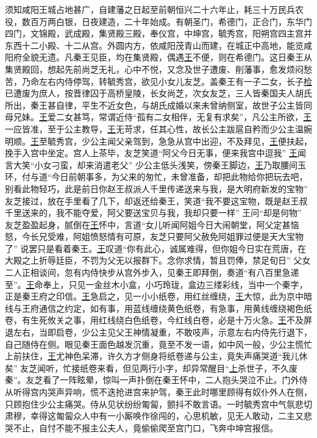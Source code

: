 \documentclass[UTF8]{ctexart}
\begin{document}
须知咸阳王城占地甚广，自建藩之日起至前朝恒兴二十六年止，耗三十万民兵农役，数百万两白银，日夜建造，二十年始成。有朝圣门，希德门，正合门，东华门四门，文锦殿，武成殿，集贤殿三殿，奉仪宫，中坤宫，毓秀宫，阳朔宫四主宫并东西十二小殿、十二从宫。外圆内方，依咸阳茂青山而建，在城正中高地，能览咸阳府全貌无遗。凡秦王见臣，均在集贤殿，偶遇\uline{王}不便，则在希德门。这日秦王从集贤殿回，想起先前尚芝无礼，心中不悦，又念及世子遭废、削藩事，愈发烦闷愁苦，乃命左右内侍停驾，转毓秀宫，欲见小女儿友芝。盖秦王有一子二女，长子\uline{检}已遭废为庶人，按晋律囚于高桥皇陵，长女尚芝，次女友芝，三人皆秦国夫人胡氏所出，秦王甚自律，平生不近女色，与胡氏成婚以来未曾纳侧室，故世子公主皆同母兄妹。\uline{王}爱二女甚笃，常谓近侍“孤有二女相伴，无复有求矣”，凡公主所欲，\uline{王}一应皆准，至于公主教导，\uline{王}无苛求，任其心性，故长公主跋扈自矜而少公主温婉明顺。\uline{王}至毓秀宫，少公主闻父亲驾到，急急从宫中出迎，不及拜见，\uline{王}便扶起，挽手入宫中坐定。宫人上茶毕，友芝笑道“阿父今日无事，便来我宫中逗我” \uline{王}闻言大笑“小女刁蛮，却来消遣老父” 少公主低头浅笑，傍秦王脚边，\uline{王}乃取腰间玉环，付与道“今日前朝事多，为父来的匆忙，未曾准备，却把此物给你把玩去吧，别看此物轻巧，此是前日你赵王叔派人千里传递送来与我，是大明府新发的宝物” 友芝接过，放在手里看了几下，却返还给秦王，笑道“我不要这宝物，既是赵王叔千里送来的，我不能夺爱，阿父要送宝贝与我，我却只要一样” 王问“却是何物” 友芝盈盈起身，腻倒在\uline{王}怀中，言道“女儿听闻阿姐今日大闹朝堂，阿父定甚恼怒，今长兄受难，阿姐愤怒情有可原，友芝只要阿父赦免阿姐罪过便是天大宝物了” 说罢只是看着秦王。\uline{王}叹道“你有此心，诚属难得，但你姐今日实在荒唐，在大殿之上折辱廷臣，不罚为父无以报群下。念你求情，暂且罚俸，禁足旬日”  父女二人正相谈间，忽有内侍快步从宫外步入，见秦王即拜倒，奏道“有八百里急递至”。\uline{王}命奉上，只见一金丝木小盒，小巧玲珑，盒边三缕彩线，当中一个秦字，正是秦王府之印信。\uline{王}急启之，见一小小纸卷，用红丝缠绕，\uline{王}大惊，此为京中暗线与王府通信之约定，如有事，用蓝线缠绕黄色纸卷，有急事，用黄线缠绕褐色纸卷，有生死攸关之事，用红线绕白色纸卷，今红线白卷，必是十万火急。\uline{王}不及屏退左右，当即启卷，少公主见父王神情凝重，不敢吱声，示意左右内侍先行退下，自己随侍在侧。眼见秦王面色越发沉重，竟至不发一语，如中风一般，少公主慌忙上前扶住，\uline{王}尤神色呆滞，许久方才侧身将纸卷递与公主，竟失声痛哭道“我儿休矣” 友芝闻听，忙接纸卷来看，但见两行小字，却异常醒目“\uline{上}杀世子，不久废秦”。友芝看了一阵眩晕，惊叫一声扑倒在秦王怀中，二人抱头哭泣不止。门外侍从听得宫内哭声异响，慌不迭抢进宫来护驾，秦王此时哪里顾得有奴仆外人在侧，只顾抱住少公主痛哭。侍从见状纷纷匍匐，颤抖不敢言语。一时毓秀宫中气氛悲切肃穆，幸得这匍匐众人中有一小厮唤作徐闯的，心思机敏，见无人敢动，二主又悲哭不止，自忖不能不报主公夫人，竟偷偷爬至宫门口，飞奔中坤宫报信。 
\end{document}
